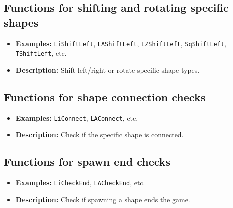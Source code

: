 \documentclass{article}
\begin{document}
\subsection{Functions for shifting and rotating specific shapes}
\begin{itemize}
    \item \textbf{Examples:} \texttt{LiShiftLeft}, \texttt{LAShiftLeft}, \texttt{LZShiftLeft}, \texttt{SqShiftLeft}, \texttt{TShiftLeft}, etc.
    \item \textbf{Description:} Shift left/right or rotate specific shape types.
\end{itemize}

\subsection{Functions for shape connection checks}
\begin{itemize}
    \item \textbf{Examples:} \texttt{LiConnect}, \texttt{LAConnect}, etc.
    \item \textbf{Description:} Check if the specific shape is connected.
\end{itemize}

\subsection{Functions for spawn end checks}
\begin{itemize}
    \item \textbf{Examples:} \texttt{LiCheckEnd}, \texttt{LACheckEnd}, etc.
    \item \textbf{Description:} Check if spawning a shape ends the game.
\end{itemize}
\end{document}
